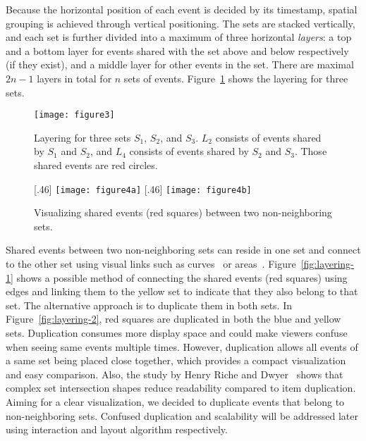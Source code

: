 Because the horizontal position of each event is decided by its timestamp, spatial grouping is achieved through vertical positioning. The sets are stacked vertically, and each set is further divided into a maximum of three horizontal \emph{layers}: a top and a bottom layer for events shared with the set above and below respectively (if they exist), and a middle layer for other events in the set. There are maximal $2n-1$ layers in total for $n$ sets of events. Figure~\ref{fig:layering} shows the layering for three sets. 

\begin{figure}[ht]
\centering
\texttt{[image: figure3]}
\caption{Layering for three sets $S_1$, $S_2$, and $S_3$. $L_2$ consists of events shared by $S_1$ and $S_2$, and $L_4$ consists of events shared by $S_2$ and $S_3$. Those shared events are red circles.}
\label{fig:layering}
\end{figure}

\begin{figure}[ht]
	\centering
	[.46\columnwidth]
		{\texttt{[image: figure4a]}}\label{fig:layering-1}
	\hfill	
	[.46\columnwidth]
		{\texttt{[image: figure4b]}}\label{fig:layering-2}
	\caption{Visualizing shared events (red squares) between two non-neighboring sets.}
	\label{fig:layering-compare}
\end{figure}

Shared events between two non-neighboring sets can reside in one set and connect to the other set using visual links such as curves~\cite{Alper2011} or areas~\cite{Meulemans2013}. Figure~\ref{fig:layering-1} shows a possible method of connecting the shared events (red squares) using edges and linking them to the yellow set to indicate that they also belong to that set. The alternative approach is to duplicate them in both sets. In Figure~\ref{fig:layering-2}, red squares are duplicated in both the blue and yellow sets. Duplication consumes more display space and could make viewers confuse when seeing same events multiple times. However, duplication allows all events of a same set being placed close together, which provides a compact visualization and easy comparison. Also, the study by Henry Riche and Dwyer~\cite{Riche2010} shows that complex set intersection shapes reduce readability compared to item duplication. Aiming for a clear visualization, we decided to duplicate events that belong to non-neighboring sets. Confused duplication and scalability will be addressed later using interaction and layout algorithm respectively.

